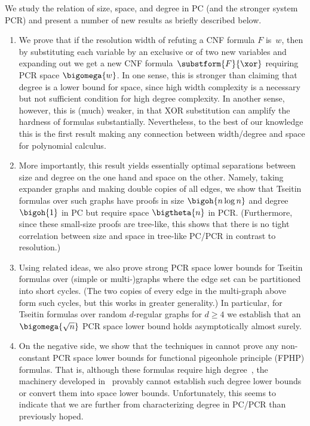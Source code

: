 We study the relation of size, space, and degree in PC (and the 
stronger system PCR) and present
a number of new results as 
briefly described below.
%
\begin{enumerate}
  \item We prove that if the resolution width of refuting a CNF
  formula $F$ is~$w$, then by substituting each variable by an
  exclusive or of two new variables and expanding out we get a new CNF
  formula~$\substform{F}{\xor}$ requiring PCR space $\bigomega{w}$.
  In one sense, this is stronger than claiming that degree is a lower
  bound for space, since high width complexity is a necessary but not
  sufficient condition for high degree complexity. In another sense,
  however, this is (much) weaker, in that XOR substitution can amplify
  the hardness of formulas substantially. Nevertheless, to the best of
  our knowledge this is the first result making any connection between
  width/degree and space for polynomial calculus.%

\item
  More importantly, this result yields essentially optimal
  separations between size and degree on the one hand and space on
  the other. Namely, taking expander graphs and making
  double copies of all edges, we show that Tseitin formulas
  over such graphs
  have proofs in size $\bigoh{n \log n }$ and
  \mbox{degree $\bigoh{1}$} in PC but require
  space $\bigtheta{n}$ in PCR.
  (Furthermore, since these small-size proofs are tree-like, this
  shows that there is no tight correlation between size and space in
  tree-like PC/PCR in contrast to
  resolution.)

\item
  Using related ideas, we also prove strong PCR space
  lower bounds for Tseitin formulas over 
  (simple or \mbox{multi-)graphs}
%
  where the edge set can be partitioned into %
  short  %
  cycles.
  (The two copies of every edge in the multi-graph above form such
  cycles, but this works in greater generality.)
  In particular, for Tseitin formulas over random $d$-regular graphs
  for $d \geq 4$ we establish that \mbox{an $\bigomega{\sqrt{n}}$} PCR
  space lower bound holds asymptotically almost surely.%

\item
  On the negative side, we show that the
  techniques in
  \cite{BG15Framework}
  cannot prove any non-constant PCR space lower bounds for
  functional pigeonhole principle (FPHP) formulas.
  That is, although these formulas require high 
  degree~\cite{MN15GeneralizedMethodDegree},
  the machinery developed in~\cite{BG15Framework}
  provably cannot establish such degree lower bounds or convert them
  into space lower bounds.
  Unfortunately, this seems to indicate that we are further from
  characterizing degree in PC/PCR than previously hoped.
\end{enumerate}

